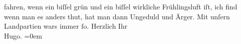 \begin{ledgroupsized}[t]{13cm}
                    fahren, wenn ein biſſel grün und ein biſſel wirkliche Frühlingsluft iſt, ich
                    find wenn {\pb}man es anders
                    thut, hat man dann Ungeduld und Ärger. Mit unſern Landpartien wars immer ſo.\pend
           \pstart
           Herzlich Ihr{\\[\baselineskip]}\spacefill\mbox{Hugo.}\pend
           \leftskip=0em{}\endnumbering{}\end{ledgroupsized}  \newcommand{\dateiname}{L00786}\newcommand{\titel}{Hugo von Hofmannsthal an Arthur Schnitzler, [23. 3. 1898]}\newcommand{\editorInnen}{Martin Anton Müller und Gerd-Hermann Susen}
      